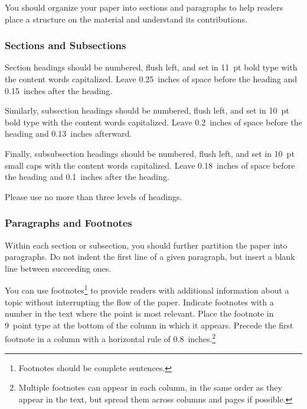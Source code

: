 \documentclass{article}
\begin{document}
You should organize your paper into sections and paragraphs to help
readers place a structure on the material and understand its
contributions.

\subsubsection{Sections and Subsections}

Section headings should be numbered, flush left, and set in 11~pt bold
type with the content words capitalized. Leave 0.25~inches of space
before the heading and 0.15~inches after the heading.

Similarly, subsection headings should be numbered, flush left, and set
in 10~pt bold type with the content words capitalized. Leave
0.2~inches of space before the heading and 0.13~inches afterward.

Finally, subsubsection headings should be numbered, flush left, and
set in 10~pt small caps with the content words capitalized. Leave
0.18~inches of space before the heading and 0.1~inches after the
heading.

Please use no more than three levels of headings.

\subsubsection{Paragraphs and Footnotes}

Within each section or subsection, you should further partition the
paper into paragraphs. Do not indent the first line of a given
paragraph, but insert a blank line between succeeding ones.

You can use footnotes\footnote{Footnotes
should be complete sentences.} to provide readers with additional
information about a topic without interrupting the flow of the paper.
Indicate footnotes with a number in the text where the point is most
relevant. Place the footnote in 9~point type at the bottom of the
column in which it appears. Precede the first footnote in a column
with a horizontal rule of 0.8~inches.\footnote{Multiple footnotes can
appear in each column, in the same order as they appear in the text,
but spread them across columns and pages if possible.}
\end{document}
